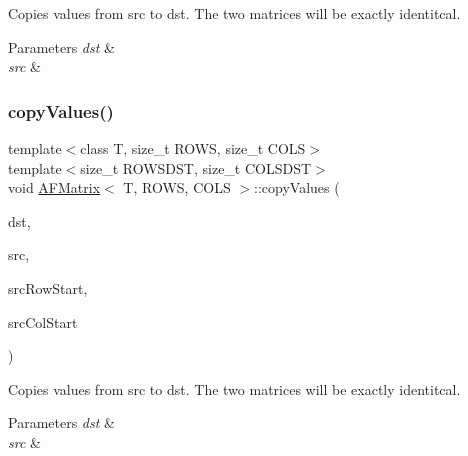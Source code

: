 Copies values from {\ttfamily src} to {\ttfamily dst}. The two matrices will be exactly identitcal. 
\begin{DoxyParams}{Parameters}
{\em dst} & \\
\hline
{\em src} & \\
\hline
\end{DoxyParams}
\mbox{\label{class_a_f_matrix_afc51204548b2e7ca35c1c3bee350e11b}} 
\subsubsection{\texorpdfstring{copy\+Values()}{copyValues()}\hspace{0.1cm}{\footnotesize\ttfamily [2/4]}}
{\footnotesize\ttfamily template$<$class T, size\+\_\+t R\+O\+WS, size\+\_\+t C\+O\+LS$>$ \\
template$<$size\+\_\+t R\+O\+W\+S\+D\+ST, size\+\_\+t C\+O\+L\+S\+D\+ST$>$ \\
void \hyperlink{class_a_f_matrix}{A\+F\+Matrix}$<$ T, R\+O\+WS, C\+O\+LS $>$\+::copy\+Values (\begin{DoxyParamCaption}\item[{\hyperlink{class_a_f_matrix}{A\+F\+Matrix}$<$ T, R\+O\+W\+S\+D\+ST, C\+O\+L\+S\+D\+ST $>$ $\ast$}]{dst,  }\item[{\hyperlink{class_a_f_matrix}{A\+F\+Matrix}$<$ T, R\+O\+WS, C\+O\+LS $>$ $\ast$}]{src,  }\item[{size\+\_\+t}]{src\+Row\+Start,  }\item[{size\+\_\+t}]{src\+Col\+Start }\end{DoxyParamCaption})\hspace{0.3cm}{\ttfamily [inline]}}

Copies values from {\ttfamily src} to {\ttfamily dst}. The two matrices will be exactly identitcal. 
\begin{DoxyParams}{Parameters}
{\em dst} & \\
\hline
{\em src} & \\
\hline
\end{DoxyParams}
\mbox{\label{class_a_f_matrix_ac655b95d85d38a72621381b5cf89df83}} 

